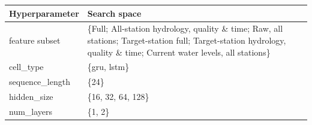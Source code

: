 \begin{tabularx}{\textwidth}{@{}lX@{}}
\toprule
\textbf{Hyperparameter} & \textbf{Search space} \\
\midrule
feature subset & \{Full; All-station hydrology, quality \& time; Raw, all stations; Target-station full; Target-station hydrology, quality \& time; Current water levels, all stations\} \\
\addlinespace
cell\_type & \{gru, lstm\} \\
\addlinespace
sequence\_length & \{24\} \\
\addlinespace
hidden\_size & \{16, 32, 64, 128\} \\
\addlinespace
num\_layers & \{1, 2\} \\
\bottomrule
\end{tabularx}
